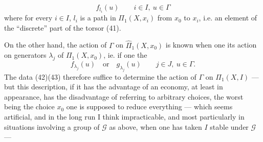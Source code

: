 \[
\tag{41}f_{l_i}(u)\qquad i\in I,\ u\in\Gamma
\]
where for every $i\in I$, $l_i$ is a path in $\Pi_1(X,x_i)$ from $x_0$ to $x_i$, i.e. an element of the ``discrete'' part of the torsor (41).

On the other hand, the action of $\Gamma$ on $\widehat\Pi_1(X,x_0)$ is known when one  its action on generators $\lambda_j$  of $\Pi_1(X,x_0)$, ie. if one  the
\[
\tag{43}f_{\lambda_j}(u)\quad\text{or}\quad g_{\lambda_j}(u)\qquad j\in J,\ u\in\Gamma.
\]
 The data (42)(43) therefore suffice to determine the action of $\Gamma$ on $\Pi_1(X,I)$ --- but this description,   if it has the advantage of an economy, at least in appearance, has the disadvantage of referring to arbitrary choices, the worst being the choice    $x_0$   one is supposed to reduce everything --- which seems artificial, and in the long run I think impracticable,  and most particularly in situations involving a group of  $\mathcal G$ as above, when one has taken $I$ stable under $\mathcal G$ ---
